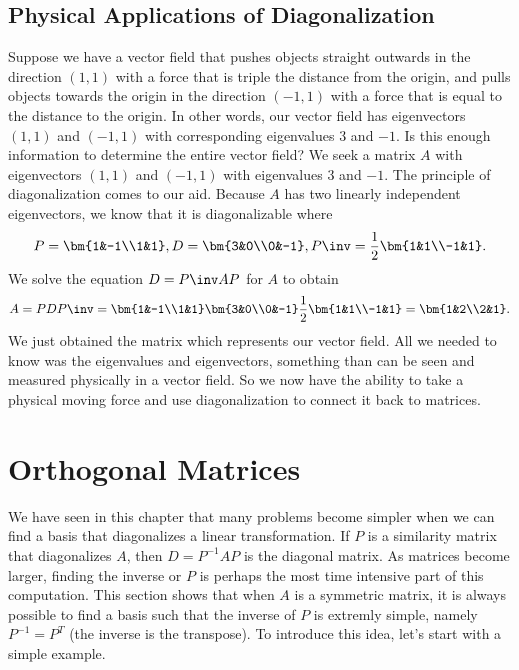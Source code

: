 \subsection{Physical Applications of Diagonalization}
Suppose we have a vector field that pushes objects straight outwards in the direction $(1,1)$ with a force that is triple the distance from the origin, and pulls objects towards the origin in the direction $(-1,1)$ with a force that is equal to the distance to the origin. In other words, our vector field has eigenvectors $(1,1)$ and $(-1,1)$ with corresponding eigenvalues $3$ and $-1$. Is this enough information to determine the entire vector field?  We seek a matrix $A$ with eigenvectors $(1,1)$ and $(-1,1)$ with eigenvalues 3 and $-1$.  The principle of diagonalization comes to our aid.  Because $A$ has two linearly independent eigenvectors, we know that it is diagonalizable where $$ P = \bm{1&-1\\1&1}, D = \bm{3&0\\0&-1},P\inv =\frac12\bm{1&1\\-1&1}. $$ We solve the equation $D = P\inv A P$ for $A$ to obtain 
$$A = PDP\inv = \bm{1&-1\\1&1}\bm{3&0\\0&-1}\frac12\bm{1&1\\-1&1} = \bm{1&2\\2&1}.$$
We just obtained the matrix which represents our vector field. All we needed to know was the eigenvalues and eigenvectors, something than can be seen and measured physically in a vector field. So we now have the ability to take a physical moving force and use diagonalization to connect it back to matrices.  

\section{Orthogonal Matrices}
We have seen in this chapter that many problems become simpler when we can find a basis that diagonalizes a linear transformation. If $P$ is a similarity matrix that diagonalizes $A$, then $D=P^{-1}AP$ is the diagonal matrix.  As matrices become larger, finding the inverse or $P$ is perhaps the most time intensive part of this computation.  This section shows that when $A$ is a symmetric matrix, it is always possible to find a basis such that the inverse of $P$ is extremly simple, namely $P^{-1} = P^T$ (the inverse is the transpose). To introduce this idea, let's start with a simple example.

